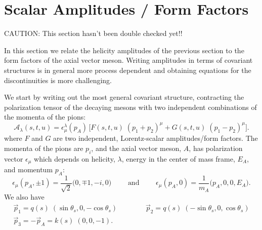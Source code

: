\documentclass[10pt, aps,prd,amsmath,amssymb,superscriptaddress,onecolumn,
nofootinbib,showpacs,preprintnumbers]{revtex4-1}
\begin{document}
\section{Scalar Amplitudes / Form Factors}

{\color{red} CAUTION: This section hasn't been double checked yet!!}

In this section we relate the helicity amplitudes of the previous section to the form factors of the axial vector meson. Writing amplitudes in terms of covariant structures is in general more process dependent and obtaining equations for the discontinuities is more challenging.

  We start by writing out the most general covariant structure, contracting the polarization tensor of the decaying mesons with two independent combinations of the momenta of the pions:
  \begin{equation}
    \label{eq:covariant}
    \mathcal{A}_\lambda(s,t,u) = \epsilon_\mu^\lambda(p_A) \, \bigg[ F(s,t,u) \; (p_1 + p_2)^\mu + G(s,t,u) \;  (p_1 - p_2)^\mu \bigg].
    \end{equation}
where \(F\) and \(G\) are two independent, Lorentz-scalar amplitudes/form factors. The momenta of the pions are \(p_i\), and the axial vector meson, \(A\), has polarization vector \(\epsilon_\mu\) which depends on helicity, \(\lambda\), energy in the center of mass frame, \(E_A\), and momentum \(p_A\):
  \begin{equation}
    \label{eq:polarization}
    \epsilon_\mu(p_A, \pm1) = \frac{1}{\sqrt{2}} \big( 0, \mp 1, - i, 0 \big) \qquad \text{ and } \qquad \epsilon_\mu(p_A, 0) = \frac{1}{m_A} \big( p_A, 0, 0, E_A \big).
    \end{equation}
We also have
  \begin{gather}
    \vec{p}_1 = q(s) \; (\sin \theta_s, 0,  -\cos \theta_s) \qquad \qquad \vec{p}_2 = q(s) \; (-\sin \theta_s, 0 , \cos \theta_s ) \\
    \vec{p}_3 = - \vec{p}_A = k(s) \; (0,0,-1). \nonumber
  \end{gather}
\end{document}
